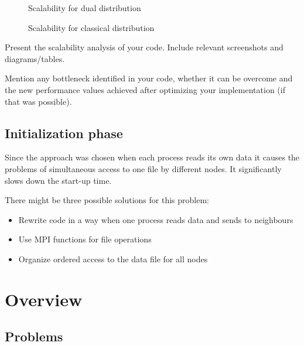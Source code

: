 \documentclass[12pt, a4paper]{article}
\newcommand{\draft}[1]{\textcolor{NavyBlue}{#1}}
\begin{document}
\begin{figure}[ht]
	\caption{Scalability for dual distribution}
	\label{fig:ScalDual}
\end{figure}

\begin{figure}[ht]
	\caption{Scalability for classical distribution}
	\label{fig:ScalClassical}
\end{figure}

\draft{
Present the scalability analysis of your code. Include relevant screenshots and diagrams/tables.}

\draft{
Mention any bottleneck identified in your code, whether it can be overcome 
and the new performance values achieved after optimizing your implementation (if that was possible).
}



\subsection{Initialization phase}

Since the approach was chosen when each process reads its own data it causes
the problems of simultaneous access to one file by different nodes.
It significantly slows down the start-up time.

There might be three possible solutions for this problem:
\begin{itemize}
	\item Rewrite code in a way when one process reads data and sends to neighbours
	\item Use MPI functions for file operations
	\item Organize ordered access to the data file for all nodes
\end{itemize}



\section{Overview}

\subsection{Problems}
\label{subsec:Problems}
\end{document}
